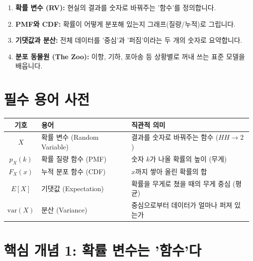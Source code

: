 \documentclass[11pt,a4paper]{book}
\theoremstyle{definition}
\begin{document}
\begin{tcolorbox}[colback=subgray, title={\textbf{📌 이 단원의 핵심 개요 (Overview)}}]
\begin{enumerate}
    \item \textbf{확률 변수 (RV):} 현실의 결과를 숫자로 바꿔주는 '함수'를 정의합니다.
    \item \textbf{PMF와 CDF:} 확률이 어떻게 분포해 있는지 그래프(질량/누적)로 그립니다.
    \item \textbf{기댓값과 분산:} 전체 데이터를 '중심'과 '퍼짐'이라는 두 개의 숫자로 요약합니다.
    \item \textbf{분포 동물원 (The Zoo):} 이항, 기하, 포아송 등 상황별로 꺼내 쓰는 표준 모델을 배웁니다.
\end{enumerate}
\end{tcolorbox}

\section{필수 용어 사전}

\begin{center}
\begin{tabular}{|c|l|l|}
\hline
\rowcolor{mainblue!20} \textbf{기호} & \textbf{용어} & \textbf{직관적 의미} \\ \hline
$X$ & 확률 변수 (Random Variable) & 결과를 숫자로 바꿔주는 함수 ($HH \to 2$) \\ \hline
$p_X(k)$ & 확률 질량 함수 (PMF) & 숫자 $k$가 나올 확률의 높이 (무게) \\ \hline
$F_X(x)$ & 누적 분포 함수 (CDF) & $x$까지 쌓아 올린 확률의 합 \\ \hline
$E[X]$ & 기댓값 (Expectation) & 확률을 무게로 쳤을 때의 무게 중심 (평균) \\ \hline
$\text{var}(X)$ & 분산 (Variance) & 중심으로부터 데이터가 얼마나 퍼져 있는가 \\ \hline
\end{tabular}
\end{center}

\section{핵심 개념 1: 확률 변수는 '함수'다}
\end{document}

